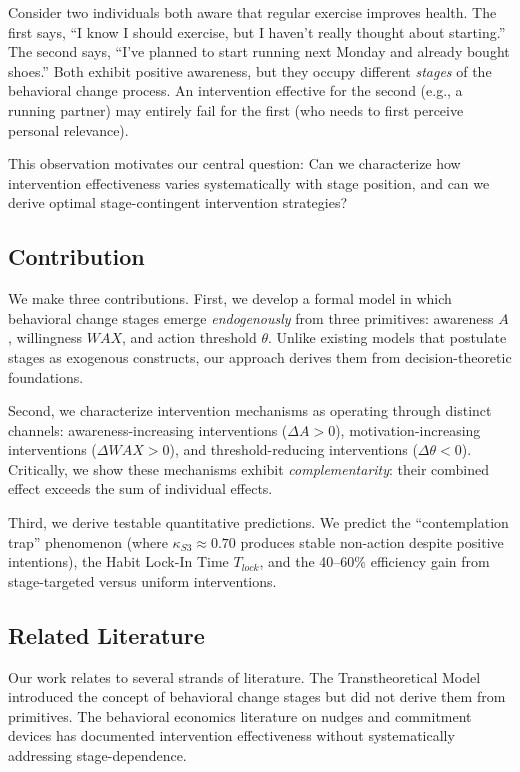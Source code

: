 \documentclass[12pt]{article}
\begin{document}
Consider two individuals both aware that regular exercise improves health. The first says, ``I know I should exercise, but I haven't really thought about starting.'' The second says, ``I've planned to start running next Monday and already bought shoes.'' Both exhibit positive awareness, but they occupy different \textit{stages} of the behavioral change process. An intervention effective for the second (e.g., a running partner) may entirely fail for the first (who needs to first perceive personal relevance).

This observation motivates our central question: Can we characterize how intervention effectiveness varies systematically with stage position, and can we derive optimal stage-contingent intervention strategies?

\subsection{Contribution}

We make three contributions. First, we develop a formal model in which behavioral change stages emerge \textit{endogenously} from three primitives: awareness $A$, willingness $WAX$, and action threshold $\theta$. Unlike existing models that postulate stages as exogenous constructs, our approach derives them from decision-theoretic foundations.

Second, we characterize intervention mechanisms as operating through distinct channels: awareness-increasing interventions ($\Delta A > 0$), motivation-increasing interventions ($\Delta WAX > 0$), and threshold-reducing interventions ($\Delta \theta < 0$). Critically, we show these mechanisms exhibit \textit{complementarity}: their combined effect exceeds the sum of individual effects.

Third, we derive testable quantitative predictions. We predict the ``contemplation trap'' phenomenon (where $\kappa_{S3} \approx 0.70$ produces stable non-action despite positive intentions), the Habit Lock-In Time $T_{lock}$, and the 40--60\% efficiency gain from stage-targeted versus uniform interventions.

\subsection{Related Literature}

Our work relates to several strands of literature. The Transtheoretical Model \citep{prochaska1983stages} introduced the concept of behavioral change stages but did not derive them from primitives. The behavioral economics literature on nudges \citep{PAP-sunstein2014nudge} and commitment devices \citep{bryan2010commitment} has documented intervention effectiveness without systematically addressing stage-dependence.
\end{document}
